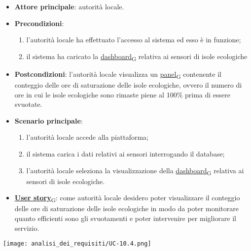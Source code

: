\begin{itemize}
	\item \textbf{Attore principale}: autorità locale.
	\item \textbf{Precondizioni}:
	      \begin{enumerate}
		      \item l'autorità locale ha effettuato l'accesso al sistema ed esso è in funzione;
		      \item il sistema ha caricato la \href{https://7last.github.io/docs/pb/documentazione-interna/glossario\#dashboard}{dashboard\textsubscript{G}} relativa ai sensori di isole ecologiche
	      \end{enumerate}
	\item \textbf{Postcondizioni}: l'autorità locale visualizza un \href{https://7last.github.io/docs/pb/documentazione-interna/glossario\#panel}{panel\textsubscript{G}} contenente il conteggio delle ore di saturazione delle isole ecologiche,
	      ovvero il numero di ore in cui le isole ecologiche sono rimaste piene al 100\% prima di essere svuotate.
	\item \textbf{Scenario principale}:
	      \begin{enumerate}
		      \item l'autorità locale accede alla piattaforma;
		      \item il sistema carica i dati relativi ai sensori interrogando il database;
		      \item l'autorità locale seleziona la visualizzazione della \href{https://7last.github.io/docs/pb/documentazione-interna/glossario\#dashboard}{dashboard\textsubscript{G}} relativa ai sensori di isole ecologiche.
	      \end{enumerate}
	\item \href{https://7last.github.io/docs/pb/documentazione-interna/glossario\#user-story}{\textbf{User story}\textsubscript{G}}:
	      come autorità locale desidero poter visualizzare il conteggio delle ore di saturazione delle isole ecologiche in modo da poter monitorare
	      quanto efficienti sono gli svuotamenti e poter intervenire per migliorare il servizio.
\end{itemize}
\begin{center}
	\texttt{[image: analisi\_dei\_requisiti/UC-10.4.png]}
\end{center}


